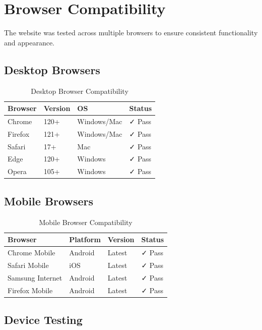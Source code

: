 \documentclass[12pt,a4paper]{report}
\begin{document}
\section{Browser Compatibility}

The website was tested across multiple browsers to ensure consistent functionality and appearance.

\subsection{Desktop Browsers}

\begin{table}[H]
\centering
\begin{tabular}{|l|l|l|l|}
\hline
\textbf{Browser} & \textbf{Version} & \textbf{OS} & \textbf{Status} \\ \hline
Chrome & 120+ & Windows/Mac & ✓ Pass \\ \hline
Firefox & 121+ & Windows/Mac & ✓ Pass \\ \hline
Safari & 17+ & Mac & ✓ Pass \\ \hline
Edge & 120+ & Windows & ✓ Pass \\ \hline
Opera & 105+ & Windows & ✓ Pass \\ \hline
\end{tabular}
\caption{Desktop Browser Compatibility}
\end{table}

\subsection{Mobile Browsers}

\begin{table}[H]
\centering
\begin{tabular}{|l|l|l|l|}
\hline
\textbf{Browser} & \textbf{Platform} & \textbf{Version} & \textbf{Status} \\ \hline
Chrome Mobile & Android & Latest & ✓ Pass \\ \hline
Safari Mobile & iOS & Latest & ✓ Pass \\ \hline
Samsung Internet & Android & Latest & ✓ Pass \\ \hline
Firefox Mobile & Android & Latest & ✓ Pass \\ \hline
\end{tabular}
\caption{Mobile Browser Compatibility}
\end{table}

\subsection{Device Testing}
\end{document}
